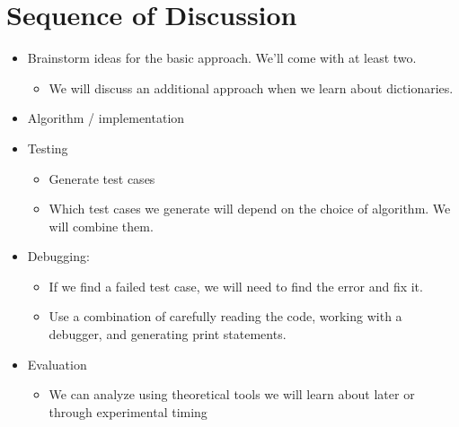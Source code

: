 \documentclass[letterpaper,10pt,english]{sphinxmanual}
\begin{document}
\section{Sequence of Discussion}
\label{\detokenize{lecture_notes/lec14_design_part1:sequence-of-discussion}}\begin{itemize}
\item {} 
Brainstorm ideas for the basic approach. We’ll come with at least
two.
\begin{itemize}
\item {} 
We will discuss an additional approach when we learn about
dictionaries.

\end{itemize}

\item {} 
Algorithm / implementation

\item {} 
Testing
\begin{itemize}
\item {} 
Generate test cases

\item {} 
Which test cases we generate will depend on the choice of
algorithm. We will combine them.

\end{itemize}

\item {} 
Debugging:
\begin{itemize}
\item {} 
If we find a failed test case, we will need to find the error and
fix it.

\item {} 
Use a combination of carefully reading the code, working with a
debugger, and generating print statements.

\end{itemize}

\item {} 
Evaluation
\begin{itemize}
\item {} 
We can analyze using theoretical tools we will learn about
later or through experimental timing

\end{itemize}

\end{itemize}
\end{document}
